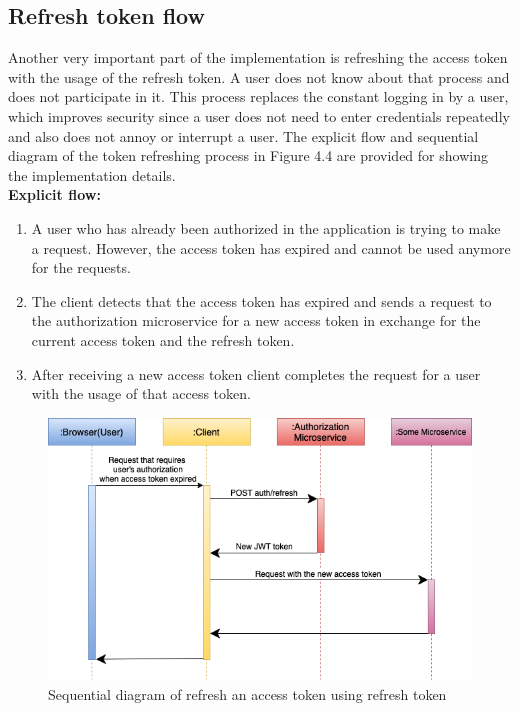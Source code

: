 \subsection{Refresh token flow} Another very important part of the implementation is refreshing the access token with the usage of the refresh token. A user does not know about that process and does not participate in it. This process replaces the constant logging in by a user, which improves security since a user does not need to enter credentials repeatedly and also does not annoy or interrupt a user. The explicit flow and sequential diagram of the token refreshing process in Figure 4.4 are provided for showing the implementation details.\\

\noindent \textbf{Explicit flow:}

\begin{enumerate}
    \item A user who has already been authorized in the application is trying to make a request. However, the access token has expired and cannot be used anymore for the requests.
    \item The client detects that the access token has expired and sends a request to the authorization microservice for a new access token in exchange for the current access token and the refresh token.
    \item After receiving a new access token client completes the request for a user with the usage of that access token.
\end{enumerate}

\begin{figure}[hp]
\centering
\includegraphics[scale=0.6]{../png/refresh_token.png}
\caption{Sequential diagram of refresh an access token using refresh token}
\end{figure}
